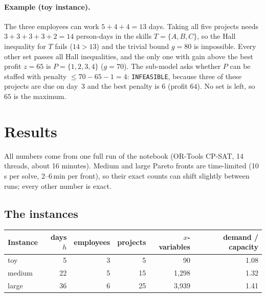 \documentclass[10pt,a4paper]{article}
\theoremstyle{plain}
\theoremstyle{definition}
\theoremstyle{remark}
\begin{document}
\paragraph{Example (toy instance).} The three employees can work $5+4+4=13$ days. Taking all five
projects needs $3+3+3+3+2=14$ person-days in the skills $T=\{A,B,C\}$, so the Hall inequality for
$T$ fails ($14>13$) and the trivial bound $g=80$ is impossible. Every other set passes all Hall
inequalities, and the only one with gain above the best profit $z=65$ is $P=\{1,2,3,4\}$ ($g=70$).
The sub-model asks whether $P$ can be staffed with penalty $\le 70-65-1=4$: \texttt{INFEASIBLE},
because three of these projects are due on day~3 and the best penalty is $6$ (profit $64$). No set is
left, so $65$ is the maximum.

\section{Results}\label{sec:results}

All numbers come from one full run of the notebook (OR-Tools CP-SAT, 14 threads, about 16 minutes).
Medium and large Pareto fronts are time-limited (10\,s per solve, 2--6\,min per front), so their
exact counts can shift slightly between runs; every other number is exact.

\subsection{The instances}

\begin{center}\begin{minipage}{\linewidth}
\centering\small
\begin{tabular}{@{}lrrrrr@{}}
\toprule
Instance & days $h$ & employees & projects & $x$-variables & demand / capacity \\
\midrule
toy    & 5  & 3 & 5  & 90    & 1.08 \\
medium & 22 & 5 & 15 & 1{,}298 & 1.32 \\
large  & 36 & 6 & 25 & 3{,}939 & 1.41 \\
\bottomrule
\end{tabular}
\end{minipage}\end{center}
\end{document}
